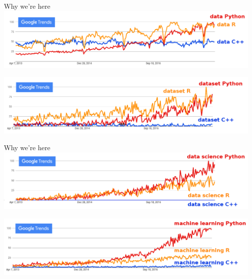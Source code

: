 \documentclass[aspectratio=169]{beamer}
\begin{document}
\begin{frame}{Why we're here}
\vspace{0.5 cm}
\includegraphics[width=\linewidth]{python-r-cpp-googletrends-data.png}

\vspace{1 cm}
\includegraphics[width=\linewidth]{python-r-cpp-googletrends-dataset.png}
\end{frame}

\begin{frame}{Why we're here}
\vspace{0.5 cm}
\includegraphics[width=\linewidth]{python-r-cpp-googletrends-datascience.png}

\vspace{1 cm}
\includegraphics[width=\linewidth]{python-r-cpp-googletrends-machinelearning.png}
\end{frame}
\end{document}
